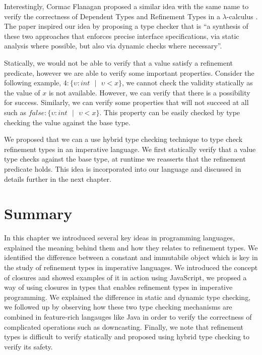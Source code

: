 \documentclass[a4paper,12pt]{report}
\begin{document}
\par
Interestingly, Cormac Flanagan 
proposed a similar idea with the same name to verify the correctness of 
Dependent Types and Refinement Types 
in a $\lambda$-calculus \cite{hybridTypeChecking}. The paper 
inspired our idea by proposing a type checker that is 
``a synthesis of these two approaches that enforces precise interface 
specifications, via static analysis where possible, but also via 
dynamic checks where necessary''.

\par
Statically, we would not be able to verify that a value satisfy a refinement 
predicate, however we are able to verify some important properties. Consider the 
following example, $4 : \{\upsilon : int\text{ }|\text{ }\upsilon < x\}$, we 
cannot check the validity statically as the value of $x$ is not available. 
However, we can verify that there is a possibility for success. Similarly, we 
can verify some properties that will not succeed at all such as 
$\textit{false} : \{\upsilon : int\text{ }|\text{ }\upsilon < x\}$. This 
property can be easily checked by type checking the value against the base type.

\par
We proposed that we can a use hybrid type checking technique to type check 
refinement types in an imperative language. We first statically verify that 
a value type checks against the base type, at runtime we reasserts that the 
refinement predicate holds. This idea is incorporated into our language 
and discussed in details further in the next chapter. 

\section{Summary}
In this chapter we introduced several key ideas in programming languages, 
explained the meaning behind them and how they relates to refinement types. 
We identified the difference between a constant and 
immutabile object which is key in the study of refinement types in 
imperative languages. We introduced the concept of closures and showed examples 
of it in action using JavaScript, we propsed a way of using closures 
in types that enables refinement types in imperative programming. 
We explained the difference in static 
and dynamic type checking, we followed up by observing how these two type 
checking mechanisms are combined in feature-rich langauges like Java in order to 
verify the correctness of complicated operations such as downcasting. Finally, 
we note that refinement types is difficult to verify statically and proposed 
using hybrid type checking to verify its safety. 
\end{document}
